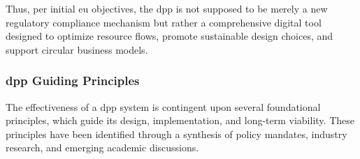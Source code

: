 Thus, per initial \ac{eu} objectives, the \ac{dpp} is not supposed to be merely a new regulatory compliance mechanism but rather a comprehensive digital tool designed to optimize resource flows, promote sustainable design choices, and support circular business models. \autocite{EuropeanParliamentandCouncil.2024}

\subsubsection*{\ac{dpp} Guiding Principles}
The effectiveness of a \ac{dpp} system is contingent upon several foundational principles, which guide its design, implementation, and long-term viability. These principles have been identified through a synthesis of policy mandates, industry research, and emerging academic discussions.

